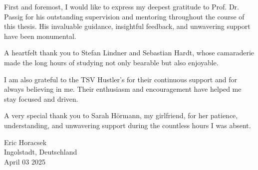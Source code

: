 


First and foremost, I would like to express my deepest gratitude to Prof. Dr. Passig for his outstanding supervision and mentoring throughout the course of this thesis. His invaluable guidance, insightful feedback, and unwavering support have been monumental.

A heartfelt thank you to Stefan Lindner and Sebastian Hardt, whose camaraderie made the long hours of studying not only bearable but also enjoyable. 

I am also grateful to the TSV Hustler's for their continuous support and for always believing in me. Their enthusiasm and encouragement have helped me stay focused and driven.

A very special thank you to Sarah Hörmann, my girlfriend, for her patience, understanding, and unwavering support during the countless hours I was absent. 
		
Eric Horacsek\\
Ingolstadt, Deutschland\\
April 03 2025